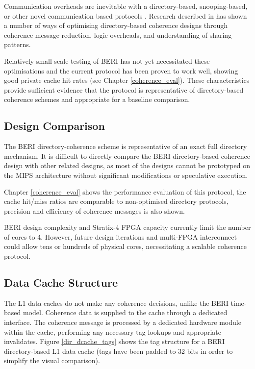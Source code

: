 			Communication overheads are inevitable with a directory-based, snooping-based, or other novel communication based protocols \cite{Ros12,Hennessy06}.
			Research described in \cite{Lilja93,Sanchez12,Cuesta11,Cuesta13,James90} has shown a number of ways of optimising directory-based coherence designs through coherence message reduction, logic overheads, and understanding of sharing patterns.
			
			Relatively small scale testing of BERI has not yet necessitated these optimisations and the current protocol has been proven to work well, showing good private cache hit rates (see Chapter \ref{coherence_eval}). These characteristics provide sufficient evidence that the protocol is representative of directory-based coherence schemes and appropriate for a baseline comparison. 
		
		\subsection{Design Comparison}
			The BERI directory-coherence scheme is representative of an exact full directory mechanism. It is difficult to directly compare the BERI directory-based coherence design with other related designs, as most of the designs cannot be prototyped on the MIPS architecture without significant modifications or speculative execution. 
			
			Chapter \ref{coherence_eval} shows the performance evaluation of this protocol, the cache hit/miss ratios are comparable to non-optimised directory protocols, precision and efficiency of coherence messages is also shown. 
	
			BERI design complexity and Stratix-4 FPGA capacity currently limit the number of cores to 4. However, future design iterations and multi-FPGA interconnect could allow tens or hundreds of physical cores, necessitating a scalable coherence protocol. 
	
	\subsection{Data Cache Structure}
		\label{dir_data_cache_structure}
		The L1 data caches do not make any coherence decisions, unlike the BERI time-based model. Coherence data is supplied to the cache through a dedicated interface. The coherence message is processed by a dedicated hardware module within the cache, performing any necessary tag lookups and appropriate invalidates. Figure \ref{dir_dcache_tags} shows the tag structure for a BERI directory-based L1 data cache (tags have been padded to 32 bits in order to simplify the visual comparison). 
		
